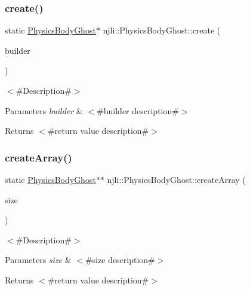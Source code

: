\subsubsection{\texorpdfstring{create()}{create()}\hspace{0.1cm}{\footnotesize\ttfamily [2/2]}}
{\footnotesize\ttfamily static \mbox{\hyperlink{classnjli_1_1_physics_body_ghost}{Physics\+Body\+Ghost}}$\ast$ njli\+::\+Physics\+Body\+Ghost\+::create (\begin{DoxyParamCaption}\item[{const \mbox{\hyperlink{classnjli_1_1_physics_body_ghost_builder}{Physics\+Body\+Ghost\+Builder}} \&}]{builder }\end{DoxyParamCaption})\hspace{0.3cm}{\ttfamily [static]}}

$<$\#\+Description\#$>$


\begin{DoxyParams}{Parameters}
{\em builder} & $<$\#builder description\#$>$\\
\hline
\end{DoxyParams}
\begin{DoxyReturn}{Returns}
$<$\#return value description\#$>$ 
\end{DoxyReturn}
\mbox{\label{classnjli_1_1_physics_body_ghost_a82c9fbfa4acc13deef6493ae7cd5840e}} 
\subsubsection{\texorpdfstring{create\+Array()}{createArray()}}
{\footnotesize\ttfamily static \mbox{\hyperlink{classnjli_1_1_physics_body_ghost}{Physics\+Body\+Ghost}}$\ast$$\ast$ njli\+::\+Physics\+Body\+Ghost\+::create\+Array (\begin{DoxyParamCaption}\item[{const \mbox{\hyperlink{_util_8h_a10e94b422ef0c20dcdec20d31a1f5049}{u32}}}]{size }\end{DoxyParamCaption})\hspace{0.3cm}{\ttfamily [static]}}

$<$\#\+Description\#$>$


\begin{DoxyParams}{Parameters}
{\em size} & $<$\#size description\#$>$\\
\hline
\end{DoxyParams}
\begin{DoxyReturn}{Returns}
$<$\#return value description\#$>$ 
\end{DoxyReturn}
\mbox{\label{classnjli_1_1_physics_body_ghost_a44e61ce35d636ee399d28cdf2eb69bce}} 
